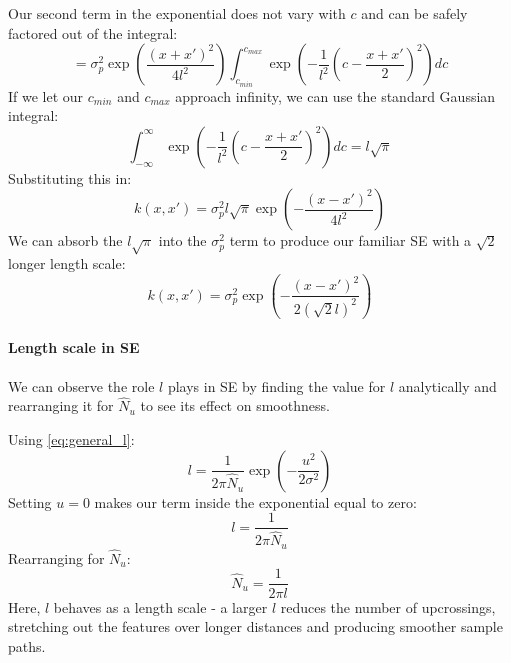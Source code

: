 Our second term in the exponential does not vary with $c$ and can be safely factored out of the integral:
\begin{equation*}
    = \sigma_p^2 \exp \left( \frac{(x + x')^2}{4l^2} \right) \int_{c_{min}}^{c_{max}} \exp \left( -\frac{1}{l^2} (c - \frac{x + x'}{2})^2 \right) dc
\end{equation*}
If we let our $c_{min}$ and $c_{max}$ approach infinity, we can use the standard Gaussian integral:
\begin{equation*}
    \int_{-\infty}^{\infty} \exp \left( -\frac{1}{l^2} (c - \frac{x + x'}{2})^2 \right) dc = l\sqrt{\pi}
\end{equation*}
Substituting this in:
\begin{equation*}
    k(x, x') = \sigma_p^2 l\sqrt{\pi} \exp \left( -\frac{(x - x')^2}{4l^2} \right)
\end{equation*}
We can absorb the $l\sqrt{\pi}$ into the $\sigma_p^2$ term to produce our familiar SE with a $\sqrt{2}$ longer length scale:
\begin{equation*}
    k(x, x') = \sigma^2_p \exp \left( -\frac{(x - x')^2}{2(\sqrt{2}l)^2} \right)
\end{equation*}

\paragraph{Length scale in SE}
We can observe the role $l$ plays in SE by finding the value for $l$ analytically and rearranging it for $\hat{N}_u$ to see its effect on smoothness.

Using \ref{eq:general_l}:
\begin{equation*}
    l = \frac{1}{2\pi\hat{N}_u} \exp\left(-\frac{u^2}{2\sigma^2}\right)
\end{equation*}
Setting $u = 0$ makes our term inside the exponential equal to zero:
\begin{equation*}
    l = \frac{1}{2\pi\hat{N}_u}
\end{equation*}
Rearranging for $\hat{N}_u$:
\begin{equation*}
    \hat{N}_u = \frac{1}{2\pi l}
\end{equation*}
Here, $l$ behaves as a length scale - a larger $l$ reduces the number of upcrossings, stretching out the features over longer distances and producing smoother sample paths.


